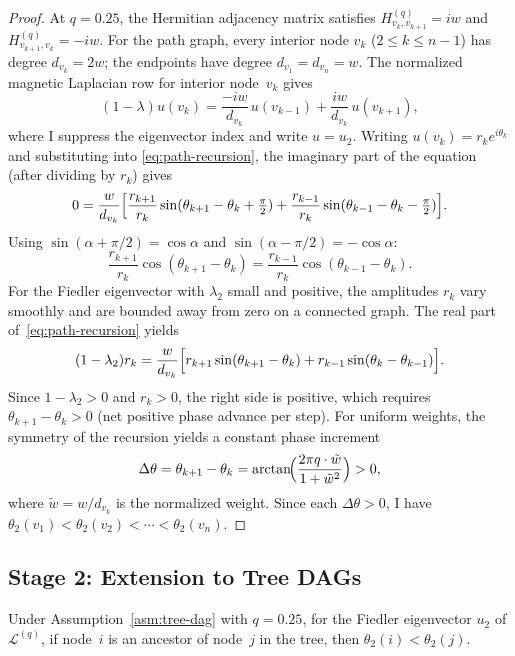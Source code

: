 \documentclass[twoside,11pt]{article}
\begin{document}
\begin{proof}
At $q=0.25$, the Hermitian adjacency matrix satisfies
$H^{(q)}_{v_k,v_{k+1}}=iw$ and $H^{(q)}_{v_{k+1},v_k}=-iw$.  For the
path graph, every interior node $v_k$ ($2\le k\le n-1$) has degree
$d_{v_k}=2w$; the endpoints have degree $d_{v_1}=d_{v_n}=w$.  The
normalized magnetic Laplacian row for interior node~$v_k$ gives
\begin{equation}
\label{eq:path-recursion}
  (1-\lambda)u(v_k)
  = \frac{-iw}{d_{v_k}}\,u(v_{k-1})
  + \frac{iw}{d_{v_k}}\,u(v_{k+1}),
\end{equation}
where I suppress the eigenvector index and write $u=u_2$.  Writing
$u(v_k)=r_k e^{i\theta_k}$ and substituting into
\eqref{eq:path-recursion}, the imaginary part of the equation (after
dividing by $r_k$) gives
\[
  0 = \frac{w}{d_{v_k}}\Bigl[
    \frac{r_{k+1}}{r_k}\sin(\theta_{k+1}-\theta_k+\tfrac{\pi}{2})
    + \frac{r_{k-1}}{r_k}\sin(\theta_{k-1}-\theta_k-\tfrac{\pi}{2})
  \Bigr].
\]
Using $\sin(\alpha+\pi/2)=\cos\alpha$ and
$\sin(\alpha-\pi/2)=-\cos\alpha$:
\[
  \frac{r_{k+1}}{r_k}\cos(\theta_{k+1}-\theta_k)
  = \frac{r_{k-1}}{r_k}\cos(\theta_{k-1}-\theta_k).
\]
For the Fiedler eigenvector with $\lambda_2$ small and positive, the
amplitudes $r_k$ vary smoothly and are bounded away from zero on a
connected graph.  The real part of~\eqref{eq:path-recursion} yields
\[
  (1-\lambda_2)r_k
  = \frac{w}{d_{v_k}}\Bigl[
    r_{k+1}\sin(\theta_{k+1}-\theta_k)
    + r_{k-1}\sin(\theta_k-\theta_{k-1})
  \Bigr].
\]
Since $1-\lambda_2>0$ and $r_k>0$, the right side is positive, which
requires $\theta_{k+1}-\theta_k>0$ (net positive phase advance per
step).  For uniform weights, the symmetry of the recursion yields a
constant phase increment
\begin{equation}
\label{eq:phase-increment}
  \Delta\theta = \theta_{k+1}-\theta_k
  = \arctan\!\Bigl(\frac{2\pi q\cdot\tilde{w}}{1+\tilde{w}^2}\Bigr)
  > 0,
\end{equation}
where $\tilde{w}=w/d_{v_k}$ is the normalized weight.  Since each
$\Delta\theta>0$, I have $\theta_2(v_1)<\theta_2(v_2)<\cdots<\theta_2(v_n)$.
\end{proof}

\subsection{Stage 2: Extension to Tree DAGs}

\begin{theorem}
\label{thm:tree-phase}
Under Assumption~\ref{asm:tree-dag} with $q=0.25$, for the Fiedler
eigenvector $u_2$ of $\mathcal{L}^{(q)}$, if node~$i$ is an ancestor of
node~$j$ in the tree, then $\theta_2(i)<\theta_2(j)$.
\end{theorem}
\end{document}
